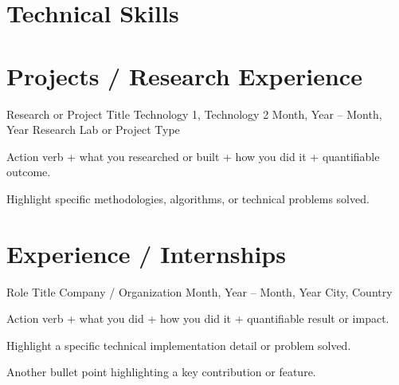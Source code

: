 \documentclass[11pt, a4paper]{article}
\begin{document}
\section{Technical Skills}


\section{Projects / Research Experience}
\cvProject
    {Research or Project Title}
    {Technology 1, Technology 2}
    {Month, Year – Month, Year}
    {Research Lab or Project Type}
    {
        \item Action verb + what you researched or built + how you did it + quantifiable outcome.
        \item Highlight specific methodologies, algorithms, or technical problems solved.
    }


\section{Experience / Internships}
\cvExperience
    {Role Title}
    {Company / Organization}
    {Month, Year – Month, Year}
    {City, Country}
    {
        \item Action verb + what you did + how you did it + quantifiable result or impact.
        \item Highlight a specific technical implementation detail or problem solved.
        \item Another bullet point highlighting a key contribution or feature.
    }

\end{document}
